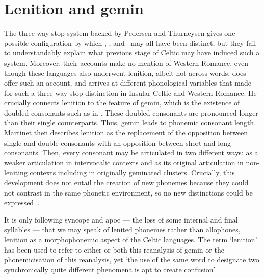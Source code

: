 \section{Lenition and \gls{gemin}}
\label{sec:martinet}
The three-way stop system backed by Pedersen and Thurneysen gives one possible configuration by which \xT, \lT, and \xD\ may all have been distinct, but they fail to understandably explain what previous stage of Celtic may have induced such a system. Moreover, their accounts make no mention of Western Romance, even though these languages also underwent lenition, albeit not across words.  \Textcite{martinet_celtic_1952} does offer such an account, and arrives at different phonological variables that made for such a three-way stop distinction in Insular Celtic and Western Romance.
He crucially connects lenition to the feature of \gls{gemin}, which is the existence of doubled consonants such as  in . These doubled consonants are pronounced longer than their single counterparts. Thus, \gls{gemin} leads to phonemic consonant length. Martinet then describes lenition as the replacement of the opposition between single and double consonants with an opposition between short and long consonants. Then, every consonant may be articulated in two different ways: as a weaker articulation in intervocalic contexts and as its original articulation in non-leniting contexts including in originally geminated clusters. Crucially, this development does not entail the creation of new \gls{phoneme}s because they could not contrast in the same phonetic environment, so no new distinctions could be expressed~\autocite[192]{martinet_celtic_1952}.

It is only following syncope and \gls{apoc} — the loss of some internal and final syllables — that we may speak of lenited \gls{phoneme}s rather than allophones, \ie lenition as a morphophonemic aspect of the Celtic languages. The term `lenition' has been used to refer to either or both this reanalysis of \gls{gemin} or the phonemicisation of this reanalysis, yet `the use of the same word to designate two synchronically quite different phenomena is apt to create confusion'~\autocite[193–194]{martinet_celtic_1952}.

